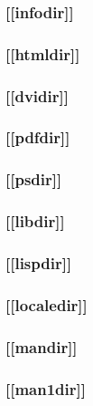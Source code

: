 \documentclass{article}
\begin{document}
\subsubsection{[[infodir]]}
\label{sec:general-structure:std-vars:infodir}

\subsubsection{[[htmldir]]}
\label{sec:general-structure:std-vars:htmldir}

\subsubsection{[[dvidir]]}
\label{sec:general-structure:std-vars:dvidir}

\subsubsection{[[pdfdir]]}
\label{sec:general-structure:std-vars:pdfdir}

\subsubsection{[[psdir]]}
\label{sec:general-structure:std-vars:psdir}

\subsubsection{[[libdir]]}
\label{sec:general-structure:std-vars:libdir}

\subsubsection{[[lispdir]]}
\label{sec:general-structure:std-vars:lispdir}

\subsubsection{[[localedir]]}
\label{sec:general-structure:std-vars:localedir}

\subsubsection{[[mandir]]}
\label{sec:general-structure:std-vars:mandir}

\subsubsection{[[man1dir]]}
\label{sec:general-structure:std-vars:man1dir}
\end{document}
